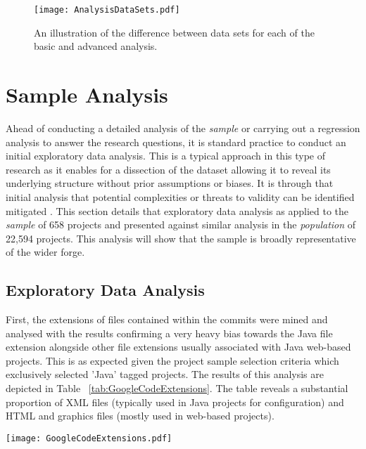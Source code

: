 \begin{figure}[htbp!] 
\centering    
\texttt{[image: AnalysisDataSets.pdf]}
\caption{An illustration of the difference between data sets for each of the basic and advanced analysis.}
\label{fig:AnalysisDataSets}
\end{figure}

\section{Sample Analysis} %
Ahead of conducting a detailed analysis of the \textit{sample} or carrying out a regression analysis to answer the research questions, it is standard practice to conduct an initial exploratory data analysis. This is a typical approach in this type of research  \citep{grechanik2010empirical, cartwright2000empirical} as it enables for a dissection of the dataset allowing it to reveal its underlying structure without prior assumptions or biases. It is through that initial analysis that potential complexities or threats to validity can be identified mitigated \citep{tukey1977exploratory}. This section details that exploratory data analysis as applied to the \textit{sample} of 658 projects and presented against similar analysis in the \textit{population} of 22,594 projects. This analysis will show that the sample is broadly representative of the wider forge.

\subsection{Exploratory Data Analysis}
First, the extensions of files contained within the commits were mined and analysed with the results confirming a very heavy bias towards the Java file extension alongside other file extensions usually associated with Java web-based projects. This is as expected given the project sample selection criteria which exclusively selected 'Java' tagged projects. The results of this analysis are depicted in Table ~\ref{tab:GoogleCodeExtensions}. The table reveals a substantial proportion of XML files (typically used in Java projects  for configuration) and HTML and graphics files (mostly used in web-based projects).

\begin{table}
\centering 
{}
\begin{tabular}
 \centering 
 \texttt{[image: GoogleCodeExtensions.pdf]}
 \label{tab:GoogleCodeExtensions}
\end{tabular}
\end{table}

